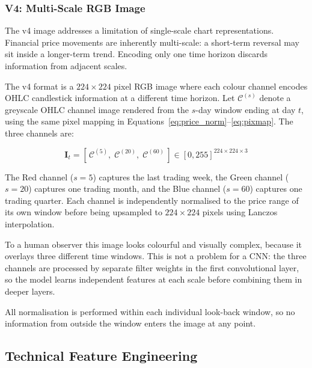 \subsubsection{V4: Multi-Scale RGB Image}
\label{sec:v4image}

The v4 image addresses a limitation of single-scale chart representations. Financial price movements are inherently multi-scale: a short-term reversal may sit inside a longer-term trend. Encoding only one time horizon discards information from adjacent scales.

The v4 format is a $224 \times 224$ pixel RGB image where each colour channel encodes OHLC candlestick information at a different time horizon. Let $\mathcal{C}^{(s)}$ denote a greyscale OHLC channel image rendered from the $s$-day window ending at day $t$, using the same pixel mapping in Equations~\eqref{eq:price_norm}--\eqref{eq:pixmap}. The three channels are:

\begin{equation}
\mathbf{I}_t = \left[\,\mathcal{C}^{(5)},\; \mathcal{C}^{(20)},\; \mathcal{C}^{(60)}\,\right] \in [0,255]^{224 \times 224 \times 3}
\label{eq:rgb_image}
\end{equation}

The Red channel ($s = 5$) captures the last trading week, the Green channel ($s = 20$) captures one trading month, and the Blue channel ($s = 60$) captures one trading quarter. Each channel is independently normalised to the price range of its own window before being upsampled to $224 \times 224$ pixels using Lanczos interpolation.

To a human observer this image looks colourful and visually complex, because it overlays three different time windows. This is not a problem for a CNN: the three channels are processed by separate filter weights in the first convolutional layer, so the model learns independent features at each scale before combining them in deeper layers.

All normalisation is performed within each individual look-back window, so no information from outside the window enters the image at any point.

\subsection{Technical Feature Engineering}
\label{sec:features}

